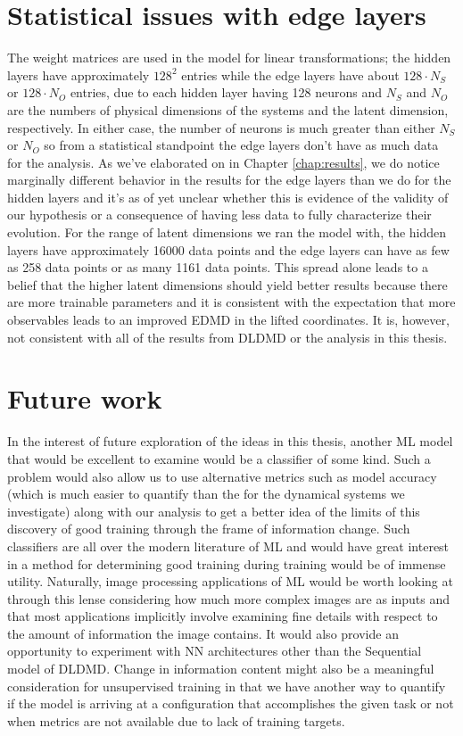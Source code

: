 \section{Statistical issues with edge layers}
The weight matrices are used in the model for linear transformations; the hidden layers 
have approximately $128^2$ entries while the edge layers 
have about $128\cdot N_S$ or $128\cdot N_O$ entries, due to each hidden layer having 128 neurons and 
$N_S$ and $N_O$ are the numbers
of physical dimensions of the systems and the latent dimension, respectively.
In either case, the number of neurons is much greater than either $N_S$ or $N_O$ so from a 
statistical standpoint the edge layers don't have as much data for the analysis. As we've elaborated on 
in Chapter \ref{chap:results}, we do notice marginally different behavior in the results for the edge 
layers than we do for the hidden layers and it's as of yet unclear whether this is evidence of the 
validity of our hypothesis or a consequence of having less data to fully characterize their evolution. 
For the range of latent dimensions we ran the model with, the hidden layers have approximately 16000 
data points and the edge layers can have as few as 258 data points or as many 1161 data points. This
spread alone leads to a belief that the higher latent dimensions should yield better results because
there are more trainable parameters and it is consistent with the expectation that more observables 
leads to an improved EDMD in the lifted coordinates. It is, however, not consistent with all of the
results from DLDMD or the analysis in this thesis.

\section{Future work}
In the interest of future exploration of the ideas in this thesis, another ML model that would be 
excellent to examine would be a classifier of some kind. Such a problem would also allow us to use 
alternative metrics such as model accuracy (which is much easier to quantify than the for the dynamical 
systems we investigate) along with our analysis to get a better idea of the limits of this discovery of 
good training through the frame of information change. Such classifiers are all over the modern literature 
of ML and would have great interest in a method for determining good training during training would be of 
immense utility. Naturally, image processing applications of ML would be worth looking at through this 
lense considering how much more complex images are as inputs and that most applications implicitly
involve examining fine details with respect to the amount of information the image contains. It would
also provide an opportunity to experiment with NN architectures other than the Sequential model 
of DLDMD. 
Change in information content might also be a meaningful consideration for unsupervised training in 
that we have another way to quantify if the model is arriving at a configuration that accomplishes the 
given task or not when metrics are not available due to lack of training targets. 